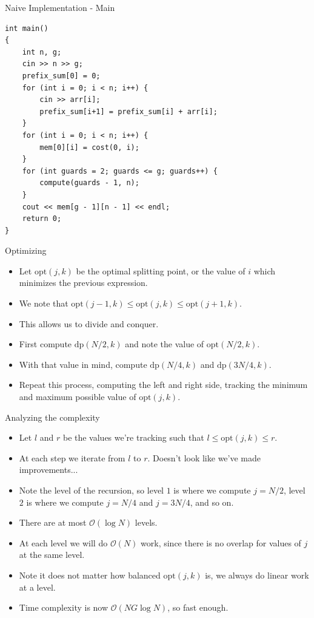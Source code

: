 \documentclass{beamer}
\begin{document}
\begin{frame}{Naive Implementation - Main}
    \begin{scriptsize}
        \begin{verbatim}           
int main()
{
    int n, g;
    cin >> n >> g;
    prefix_sum[0] = 0;
    for (int i = 0; i < n; i++) {
        cin >> arr[i];
        prefix_sum[i+1] = prefix_sum[i] + arr[i];
    }
    for (int i = 0; i < n; i++) {
        mem[0][i] = cost(0, i);
    }
    for (int guards = 2; guards <= g; guards++) {
        compute(guards - 1, n);
    }
    cout << mem[g - 1][n - 1] << endl;
    return 0;
}
        \end{verbatim}
    \end{scriptsize}
\end{frame}

\begin{frame}[plain]{Optimizing}
    \begin{itemize}
        \item<1-> Let $\mathrm{opt}(j, k)$ be the optimal splitting point, or the value of $i$ which minimizes the previous expression.
        \item<2-> We note that $\mathrm{opt}(j-1, k) \leq \mathrm{opt}(j, k) \leq \mathrm{opt}(j+1, k)$.
        \item<3-> This allows us to divide and conquer.
        \item<4-> First compute $\mathrm{dp}(N/2, k)$ and note the value of $\mathrm{opt}(N/2, k)$.
        \item<5-> With that value in mind, compute $\mathrm{dp}(N/4, k)$ and $\mathrm{dp}(3N/4, k)$.
        \item<6-> Repeat this process, computing the left and right side, tracking the minimum and maximum possible value of $\mathrm{opt}(j, k)$.
    \end{itemize}
\end{frame}

\begin{frame}[plain]{Analyzing the complexity}
    \begin{itemize}
        \item<1-> Let $l$ and $r$ be the values we're tracking such that $l \le \mathrm{opt}(j, k) \le r$.
        \item<2-> At each step we iterate from $l$ to $r$. Doesn't look like we've made improvements...
        \item<3-> Note the level of the recursion, so level $1$ is where we compute $j=N/2$, level $2$ is where we compute $j=N/4$ and $j=3N/4$, and so on.
        \item<4-> There are at most $\mathcal{O}(\log N)$ levels.
        \item<5-> At each level we will do $\mathcal{O}(N)$ work, since there is no overlap for values of $j$ at the same level.
        \item<6-> Note it does not matter how balanced $\mathrm{opt}(j, k)$ is, we always do linear work at a level.
        \item<7-> Time complexity is now $\mathcal{O}(NG \log N)$, so fast enough.
    \end{itemize}
\end{frame}
\end{document}
